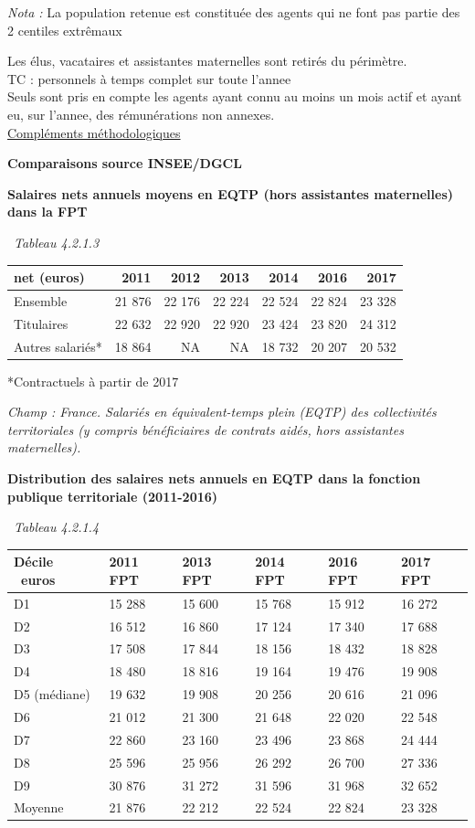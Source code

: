 \emph{Nota :} La population retenue est constituée des agents qui ne
font pas partie des 2 centiles extrêmaux

Les élus, vacataires et assistantes maternelles sont retirés du
périmètre.\\
TC : personnels à temps complet sur toute l'annee\\
Seuls sont pris en compte les agents ayant connu au moins un mois actif
et ayant eu, sur l'annee, des rémunérations non annexes.\\
\href{../Docs/méthodologie.pdf}{Compléments méthodologiques}

\textbf{Comparaisons source INSEE/DGCL}

\textbf{Salaires nets annuels moyens en EQTP (hors assistantes
maternelles) dans la FPT}

~\emph{Tableau 4.2.1.3}

\begin{longtable}[]{@{}lrrrrrr@{}}
\toprule
net (euros) & 2011 & 2012 & 2013 & 2014 & 2016 & 2017\tabularnewline
\midrule
\endhead
Ensemble & 21 876 & 22 176 & 22 224 & 22 524 & 22 824 & 23
328\tabularnewline
Titulaires & 22 632 & 22 920 & 22 920 & 23 424 & 23 820 & 24
312\tabularnewline
Autres salariés* & 18 864 & NA & NA & 18 732 & 20 207 & 20
532\tabularnewline
\bottomrule
\end{longtable}

*Contractuels à partir de 2017

\emph{Champ : France. Salariés en équivalent-temps plein (EQTP) des
collectivités territoriales (y compris bénéficiaires de contrats aidés,
hors assistantes maternelles).}

\textbf{Distribution des salaires nets annuels en EQTP dans la fonction
publique territoriale (2011-2016)}

~\emph{Tableau 4.2.1.4}

\begin{longtable}[]{@{}llllll@{}}
\toprule
Décile ~euros & 2011 FPT & 2013 FPT & 2014 FPT & 2016 FPT & 2017
FPT\tabularnewline
\midrule
\endhead
D1 & 15 288 & 15 600 & 15 768 & 15 912 & 16 272\tabularnewline
D2 & 16 512 & 16 860 & 17 124 & 17 340 & 17 688\tabularnewline
D3 & 17 508 & 17 844 & 18 156 & 18 432 & 18 828\tabularnewline
D4 & 18 480 & 18 816 & 19 164 & 19 476 & 19 908\tabularnewline
D5 (médiane) & 19 632 & 19 908 & 20 256 & 20 616 & 21 096\tabularnewline
D6 & 21 012 & 21 300 & 21 648 & 22 020 & 22 548\tabularnewline
D7 & 22 860 & 23 160 & 23 496 & 23 868 & 24 444\tabularnewline
D8 & 25 596 & 25 956 & 26 292 & 26 700 & 27 336\tabularnewline
D9 & 30 876 & 31 272 & 31 596 & 31 968 & 32 652\tabularnewline
Moyenne & 21 876 & 22 212 & 22 524 & 22 824 & 23 328\tabularnewline
\bottomrule
\end{longtable}

